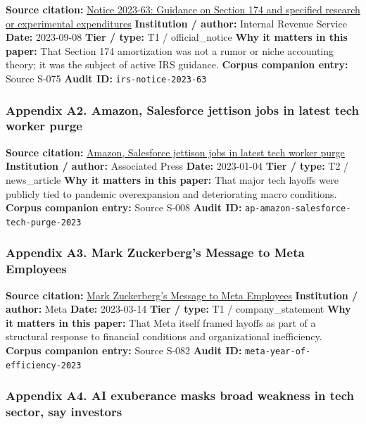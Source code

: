 \documentclass[
  american,
  11pt,
  letterpaper,
]{article}
\begin{document}
\textbf{Source citation:}
\href{https://www.irs.gov/pub/irs-drop/n-23-63.pdf}{Notice 2023-63:
Guidance on Section 174 and specified research or experimental
expenditures} \textbf{Institution / author:} Internal Revenue Service
\textbf{Date:} 2023-09-08 \textbf{Tier / type:} T1 / official\_notice
\textbf{Why it matters in this paper:} That Section 174 amortization was
not a rumor or niche accounting theory; it was the subject of active IRS
guidance. \textbf{Corpus companion entry:} Source S-075 \textbf{Audit
ID:} \texttt{irs-notice-2023-63}

\subsubsection{Appendix A2. Amazon, Salesforce jettison jobs in latest
tech worker
purge}\label{ch-05-appendix-a2-amazon-salesforce-jettison-jobs-in-latest-tech-worker-purge}

\textbf{Source citation:}
\href{https://apnews.com/article/bbb2f3a09eafdfc7cda54a3b87e538ad}{Amazon,
Salesforce jettison jobs in latest tech worker purge}
\textbf{Institution / author:} Associated Press \textbf{Date:}
2023-01-04 \textbf{Tier / type:} T2 / news\_article \textbf{Why it
matters in this paper:} That major tech layoffs were publicly tied to
pandemic overexpansion and deteriorating macro conditions.
\textbf{Corpus companion entry:} Source S-008 \textbf{Audit ID:}
\texttt{ap-amazon-salesforce-tech-purge-2023}

\subsubsection{Appendix A3. Mark Zuckerberg's Message to Meta
Employees}\label{ch-05-appendix-a3-mark-zuckerberg-s-message-to-meta-employees}

\textbf{Source citation:}
\href{https://about.fb.com/news/2023/03/mark-zuckerberg-meta-year-of-efficiency/}{Mark
Zuckerberg's Message to Meta Employees} \textbf{Institution / author:}
Meta \textbf{Date:} 2023-03-14 \textbf{Tier / type:} T1 /
company\_statement \textbf{Why it matters in this paper:} That Meta
itself framed layoffs as part of a structural response to financial
conditions and organizational inefficiency. \textbf{Corpus companion
entry:} Source S-082 \textbf{Audit ID:}
\texttt{meta-year-of-efficiency-2023}

\subsubsection{Appendix A4. AI exuberance masks broad weakness in tech
sector, say
investors}\label{ch-05-appendix-a4-ai-exuberance-masks-broad-weakness-in-tech-sector-say-investors}
\end{document}
